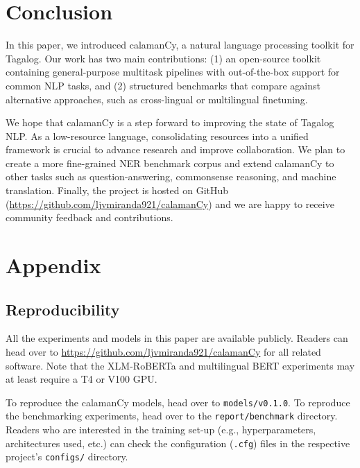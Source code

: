 \documentclass[11pt]{article}
\begin{document}
\section{Conclusion}

In this paper, we introduced calamanCy, a natural language processing toolkit for Tagalog.
Our work has two main contributions: (1) an open-source toolkit containing general-purpose multitask pipelines with out-of-the-box support for common NLP tasks, and
(2) structured benchmarks that compare against alternative approaches, such as cross-lingual or multilingual finetuning. 

We hope that calamanCy is a step forward to improving the state of Tagalog NLP. 
As a low-resource language, consolidating resources into a unified framework is crucial to advance research and improve collaboration.
We plan to create a more fine-grained NER benchmark corpus and extend calamanCy to other tasks such as question-answering, commonsense reasoning, and machine translation.
Finally, the project is hosted on GitHub (\url{https://github.com/ljvmiranda921/calamanCy}) and we are happy to receive community feedback and contributions.

\newpage



\appendix

\section{Appendix}

\subsection{Reproducibility}



All the experiments and models in this paper are available publicly. 
Readers can head over to \url{https://github.com/ljvmiranda921/calamanCy} for all related software.
Note that the XLM-RoBERTa and multilingual BERT experiments may at least require a T4 or V100 GPU.

To reproduce the calamanCy models, head over to \texttt{models/v0.1.0}.
To reproduce the benchmarking experiments, head over to the \texttt{report/benchmark} directory.
Readers who are interested in the training set-up (e.g., hyperparameters, architectures used, etc.) can check the configuration (\texttt{.cfg}) files in the respective project's \texttt{configs/} directory.
\end{document}
